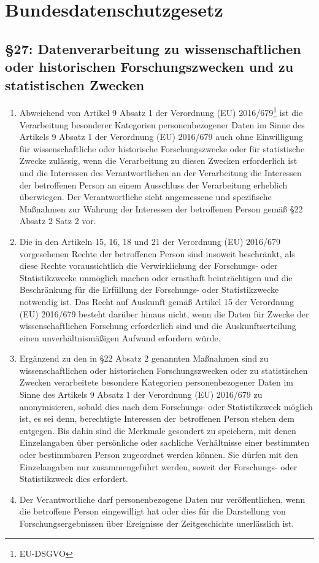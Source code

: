 \chapter{Bundesdatenschutzgesetz}
\minitoc
    \section[\S 27: Datenverarbeitung zu \dots statistischen Zwecken]{\S 27: Datenverarbeitung zu wissenschaftlichen oder historischen Forschungszwecken und zu statistischen Zwecken}
        \begin{enumerate}[label=(\arabic*)]
            \item Abweichend von Artikel 9 Absatz 1 der Verordnung (EU) 2016/679\footnote{EU-DSGVO} ist die Verarbeitung besonderer Kategorien personenbezogener Daten im Sinne des Artikels 9 Absatz 1 der Verordnung (EU) 2016/679 auch ohne Einwilligung für wissenschaftliche oder historische Forschungszwecke oder für statistische Zwecke zulässig, wenn die Verarbeitung zu diesen Zwecken erforderlich ist und die Interessen des Verantwortlichen an der Verarbeitung die Interessen der betroffenen Person an einem Ausschluss der Verarbeitung erheblich überwiegen. Der Verantwortliche sieht angemessene und spezifische Maßnahmen zur Wahrung der Interessen der betroffenen Person gemäß \S 22 Absatz 2 Satz 2 vor.
            \item Die in den Artikeln 15, 16, 18 und 21 der Verordnung (EU) 2016/679 vorgesehenen Rechte der betroffenen Person sind insoweit beschränkt, als diese Rechte voraussichtlich die Verwirklichung der Forschungs- oder Statistikzwecke unmöglich machen oder ernsthaft beinträchtigen und die Beschränkung für die Erfüllung der Forschungs- oder Statistikzwecke notwendig ist. Das Recht auf Auskunft gemäß Artikel 15 der Verordnung (EU) 2016/679 besteht darüber hinaus nicht, wenn die Daten für Zwecke der wissenschaftlichen Forschung erforderlich sind und die Auskunftserteilung einen unverhältnismäßigen Aufwand erfordern würde.
            \item Ergänzend zu den in \S 22 Absatz 2 genannten Maßnahmen sind zu wissenschaftlichen oder historischen Forschungszwecken oder zu statistischen Zwecken verarbeitete besondere Kategorien personenbezogener Daten im Sinne des Artikels 9 Absatz 1 der Verordnung (EU) 2016/679 zu anonymisieren, sobald dies nach dem Forschungs- oder Statistikzweck möglich ist, es sei denn, berechtigte Interessen der betroffenen Person stehen dem entgegen. Bis dahin sind die Merkmale gesondert zu speichern, mit denen Einzelangaben über persönliche oder sachliche Verhältnisse einer bestimmten oder bestimmbaren Person zugeordnet werden können. Sie dürfen mit den Einzelangaben nur zusammengeführt werden, soweit der Forschungs- oder Statistikzweck dies erfordert.
            \item Der Verantwortliche darf personenbezogene Daten nur veröffentlichen, wenn die betroffene Person eingewilligt hat oder dies für die Darstellung von Forschungsergebnissen über Ereignisse der Zeitgeschichte unerlässlich ist.
        \end{enumerate}

